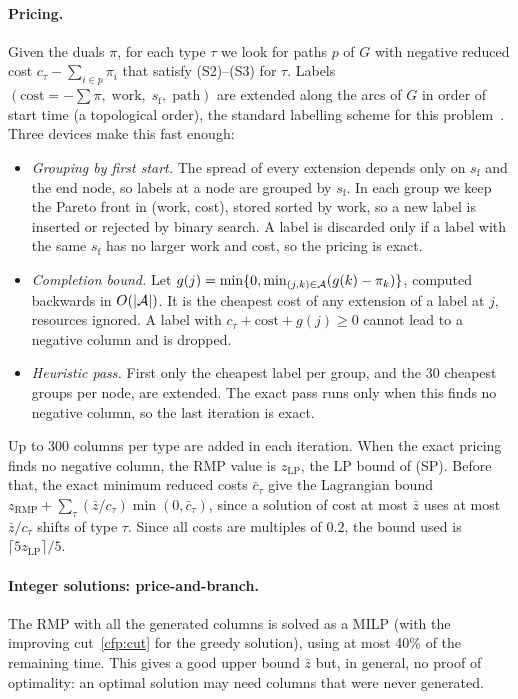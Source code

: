\paragraph{Pricing.} Given the duals $\pi$, for each type $\tau$ we look for
paths $p$ of $G$ with negative reduced cost $c_\tau-\sum_{i\in p}\pi_i$ that
satisfy (S2)--(S3) for $\tau$. Labels $(\text{cost}=-\sum\pi,\;\text{work},\;
s_{\mathrm f},\;\text{path})$ are extended along the arcs of $G$ in order of
start time (a topological order), the standard labelling scheme for this
problem~\cite{irnich2005}. Three devices make this fast enough:
\begin{itemize}[nosep]
  \item \emph{Grouping by first start.} The spread of every extension
    depends only on $s_{\mathrm f}$ and the end node, so labels at a node are
    grouped by $s_{\mathrm f}$. In each group we keep the Pareto front in
    (work, cost), stored sorted by work, so a new label is inserted or
    rejected by binary search. A label is discarded only if a label with the
    same $s_{\mathrm f}$ has no larger work and cost, so the pricing is exact.
  \item \emph{Completion bound.} Let
    $g(j)=\min\{0,\min_{(j,k)\in\mathcal{A}}(g(k)-\pi_k)\}$, computed backwards in
    $O(|\mathcal{A}|)$. It is the cheapest cost of any extension of a label at $j$,
    resources ignored. A label with $c_\tau+\text{cost}+g(j)\ge0$ cannot lead
    to a negative column and is dropped.
  \item \emph{Heuristic pass.} First only the cheapest label per group, and
    the 30 cheapest groups per node, are extended. The exact pass runs only
    when this finds no negative column, so the last iteration is exact.
\end{itemize}
Up to 300 columns per type are added in each iteration. When the exact
pricing finds no negative column, the RMP value is $z_{\mathrm{LP}}$, the LP
bound of (SP). Before that, the exact minimum reduced costs
$\bar c_\tau$ give the Lagrangian bound~\cite{lubbecke2005}
$z_{\mathrm{RMP}}+\sum_\tau(\bar z/c_\tau)\min(0,\bar c_\tau)$, since a
solution of cost at most $\bar z$ uses at most $\bar z/c_\tau$ shifts of
type $\tau$. Since all costs are multiples of $0.2$, the bound used is
$\lceil 5z_{\mathrm{LP}}\rceil/5$.

\paragraph{Integer solutions: price-and-branch.} The RMP with all the
generated columns is solved as a MILP (with the improving
cut~\eqref{cfp:cut} for the greedy solution), using at most 40\% of the
remaining time. This gives a good upper bound $\bar z$ but, in general, no
proof of optimality: an optimal solution may need columns that were never
generated.

